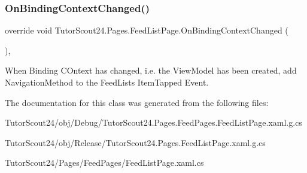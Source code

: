 \subsubsection{\texorpdfstring{On\+Binding\+Context\+Changed()}{OnBindingContextChanged()}}
{\footnotesize\ttfamily override void Tutor\+Scout24.\+Pages.\+Feed\+List\+Page.\+On\+Binding\+Context\+Changed (\begin{DoxyParamCaption}{ }\end{DoxyParamCaption})\hspace{0.3cm}{\ttfamily [inline]}, {\ttfamily [protected]}}



When Binding C\+Ontext has changed, i.\+e. the View\+Model has been created, add Navigation\+Method to the Feed\+List\textquotesingle{}s Item\+Tapped Event. 



The documentation for this class was generated from the following files\+:\begin{DoxyCompactItemize}
\item 
Tutor\+Scout24/obj/\+Debug/Tutor\+Scout24.\+Pages.\+Feed\+Pages.\+Feed\+List\+Page.\+xaml.\+g.\+cs\item 
Tutor\+Scout24/obj/\+Release/Tutor\+Scout24.\+Pages.\+Feed\+List\+Page.\+xaml.\+g.\+cs\item 
Tutor\+Scout24/\+Pages/\+Feed\+Pages/Feed\+List\+Page.\+xaml.\+cs\end{DoxyCompactItemize}
